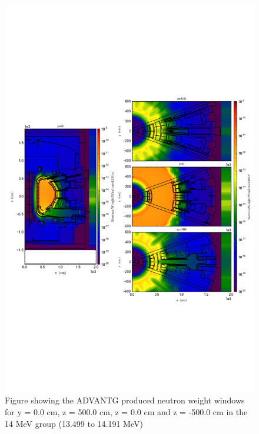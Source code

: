 \documentclass[12pt]{article}
\begin{document}
\begin{figure}[ht!]
  \centering
  \includegraphics[trim={0cm 9cm 0cm 10cm},clip,scale=0.75]{../plots/wwinp/Neutron_Weight_Windows_14MeV.png}
  \caption{Figure showing the ADVANTG produced neutron weight windows for y = 0.0 cm,
  z = 500.0 cm, z = 0.0 cm and z = -500.0 cm in the 14 MeV group (13.499 to 14.191 MeV)}
  \label{fig:wwinp_14}
\end{figure}
\end{document}
